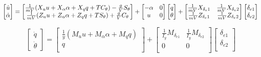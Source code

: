 \begin{equation}
    \begin{bmatrix}
        \dot u \\
        \dot \alpha
    \end{bmatrix}
    =
    \begin{bmatrix}
        \frac{1}{mV} (X_u u + X_\alpha \alpha + X_q q + T C_\theta) - \frac{g}{V} S_\theta \\
        \frac{1}{mV} (Z_u u + Z_\alpha \alpha + Z_q q + T S_\theta) + \frac{g}{V} C_\theta
    \end{bmatrix}
    +
    \begin{bmatrix}
    - \alpha & 0 \\
    u & 0
    \end{bmatrix}
    \begin{bmatrix}
      q  \\
      \theta
    \end{bmatrix}
    +
    \begin{bmatrix}
     \frac{1}{mV} X_{\delta_e1} & \frac{1}{mV} X_{\delta_e2} \\
     \frac{1}{mV} Z_{\delta_e1} & \frac{1}{mV} Z_{\delta_e2} \\
    \end{bmatrix}
    \begin{bmatrix}
        \delta_{e1} \\
        \delta_{e2} \\
    \end{bmatrix} \nonumber\\
\end{equation}

\begin{equation}
    \begin{bmatrix}
        \dot q \\
        \dot \theta
    \end{bmatrix}
    =
    \begin{bmatrix}
        \frac{1}{y} (M_u u + M_\alpha \alpha + M_q q) \\
        q \\
    \end{bmatrix}
    +
    \begin{bmatrix}
     \frac{1}{I_y} M_{\delta_{e1}} & \frac{1}{I_y} M_{\delta_{e2}} \\
      0 & 0 \\
    \end{bmatrix}
    \begin{bmatrix}
        \delta_{e1} \\
        \delta_{e2} \\
    \end{bmatrix}
\end{equation}

